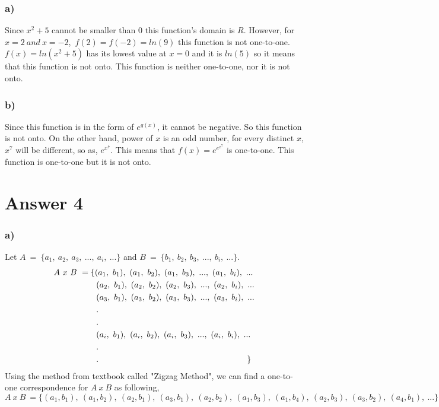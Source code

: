 \documentclass[12pt]{article}
\begin{document}
\subsubsection*{a)}
\hspace{2cm}Since $x^2+5$ cannot be smaller than 0 this function's domain is $R$. However, for $x=2\ and\ x=-2$,\ $f(2)=f(-2)=ln(9)$ this function is not one-to-one. $f(x)=ln(x^2+5)$ has its lowest value at $x=0$ and it is $ln(5)$ so it means that this function is not onto. This function is neither one-to-one, nor it is not onto.
\subsubsection*{b)}
\hspace{2cm}Since this function is in the form of $e^{g(x)}$, it cannot be negative. So this function is not onto. On the other hand, power of $x$ is an odd number, for every distinct $x$, $x^7$ will be different, so as, $e^{x^7}$. This means that $f(x)=e^{e^{x^7}}$ is one-to-one. This function is one-to-one but it is not onto.

\section*{Answer 4}
\subsubsection*{a)}
\hspace{2cm} Let $A\ = \ \{ a_1,\ a_2,\ a_3, \ ...,\ a_i, \ ... \}$ and $B \ = \ \{ b_1,\ b_2,\ b_3, \ ...,\ b_i, \ ... \}$. \\
\begin{equation} 
\begin{split}
A\ x\ B \  & = \{ (a_1,\ b_1),\ (a_1,\ b_2),\ (a_1,\ b_3),\ ...,\ (a_1,\ b_i),\ ... \\
 & \qquad (a_2,\ b_1),\ (a_2,\ b_2),\ (a_2,\ b_3),\ ...,\ (a_2,\ b_i),\ ... \\
 & \qquad (a_3,\ b_1),\ (a_3,\ b_2),\ (a_3,\ b_3),\ ...,\ (a_3,\ b_i),\ ... \\
 & \qquad . \\ & \qquad . \\
  & \qquad (a_i,\ b_1),\ (a_i,\ b_2),\ (a_i,\ b_3),\ ...,\ (a_i,\ b_i),\ ... \\
   & \qquad . \\ & \qquad . \hspace{6.3cm}  \}
\end{split}
\end{equation}
Using the method from textbook called "Zigzag Method", we can find a one-to-one correspondence for $A\ x\ B$ as following, 
$$
A\ x\ B \ = \{(a_1,b_1),\ (a_1,b_2),\ (a_2,b_1),\ (a_3,b_1),\ (a_2,b_2),\ (a_1,b_3),\ (a_1,b_4),\ (a_2,b_3),\ (a_3,b_2),\ (a_4,b_1),\ ...   \}
$$
\end{document}
